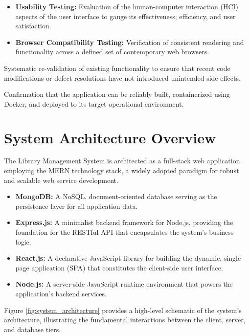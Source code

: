 \begin{description}
\begin{itemize}
            \item \textbf{Usability Testing:} Evaluation of the human-computer interaction (HCI) aspects of the user interface to gauge its effectiveness, efficiency, and user satisfaction.
            \item \textbf{Browser Compatibility Testing:} Verification of consistent rendering and functionality across a defined set of contemporary web browsers.
        \end{itemize}
    \item[Regression Testing:] Systematic re-validation of existing functionality to ensure that recent code modifications or defect resolutions have not introduced unintended side effects.
    \item[Installation and Deployment Testing:] Confirmation that the application can be reliably built, containerized using Docker, and deployed to its target operational environment.
\end{description}

\section{System Architecture Overview}
\label{sec:system_overview}
The Library Management System is architected as a full-stack web application employing the MERN technology stack, a widely adopted paradigm for robust and scalable web service development.
\begin{itemize}
    \item \textbf{MongoDB:} A NoSQL, document-oriented database serving as the persistence layer for all application data.
    \item \textbf{Express.js:} A minimalist backend framework for Node.js, providing the foundation for the RESTful API that encapsulates the system's business logic.
    \item \textbf{React.js:} A declarative JavaScript library for building the dynamic, single-page application (SPA) that constitutes the client-side user interface.
    \item \textbf{Node.js:} A server-side JavaScript runtime environment that powers the application's backend services.
\end{itemize}

Figure \ref{fig:system_architecture} provides a high-level schematic of the system's architecture, illustrating the fundamental interactions between the client, server, and database tiers.


